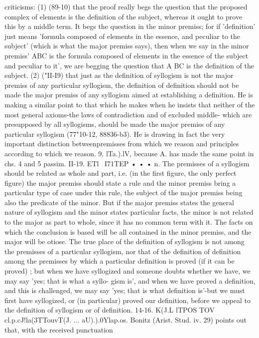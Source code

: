 {{{{{{{{{{{{{{{{{{{{criticisms: (1) (89-10) that the proof really begs the question that
the proposed complex of elements is the definition of the subject,
whereas it ought to prove this by a middle term. It begs the
question in the minor premiss; for if 'definition' just means
'formula composed of elements in the essence, and peculiar to
the subject' (which is what the major premiss says), then when
we say in the minor premiss' ABC is the formula composed of
elements in the essence of the subject and peculiar to it', we are
begging the question that A BC is the definition of the subject.
(2) ("II-I9) that just as the definition of syllogism is not the major
premiss of any particular syllogism, the definition of definition
should not be made the major premiss of any syllogism aimed at
establishing a definition. He is making a similar point to that
which he makes when he insists that neither of the most general
axioms-the laws of contradiction and of excluded middle-
which are presupposed by all syllogisms, should be made the
major premiss of any particular syllogism (77"10-12, 88836-b3).
He is drawing in fact the very important distinction betweenpremisses from which we reason and principles according to
which we reason.
9. lTa.).lV, because A. has made the same point in chs. 4 and 5
passim.
II-19. ETl ~I71TEP • • • n. The premisses of a syllogism should
be related as whole and part, i.e. (in the first figure, the only
perfect figure) the major premiss should state a rule and the
minor premiss bring a particular type of case under this rule, the
subject of the major premiss being also the predicate of the minor.
But if the major premiss states the general nature of syllogism
and the minor states particular facts, the minor is not related
to the major as part to whole, since it has no common term with
it. The facts on which the conclusion is based will be all contained
in the minor premiss, and the major will be otiose. The true
place of the definition of syllogism is not among the premisses
of a particular syllogism, nor that of the definition of definition
among the premisses by which a particular definition is proved
(if it can be proved) ; but when we have syllogized and someone
doubts whether we have, we may say 'yes; that is what a syllo-
gism is', and when we have proved a definition, and this is
challenged, we may say 'yes; that is what definition is'-but we
must first have syllogized, or (in particular) proved our definition,
before we appeal to the definition of syllogism or of definition.
14-16. K(J.L lTPOS TOV cl.p.cJ!la(3T}TouvT(J. ... aU).).0Ylap.os. Bonitz
(Arist. Stud. iv. 29) points out that, with the received punctuation
}}}}}}}}}}}}}}}}}}}
